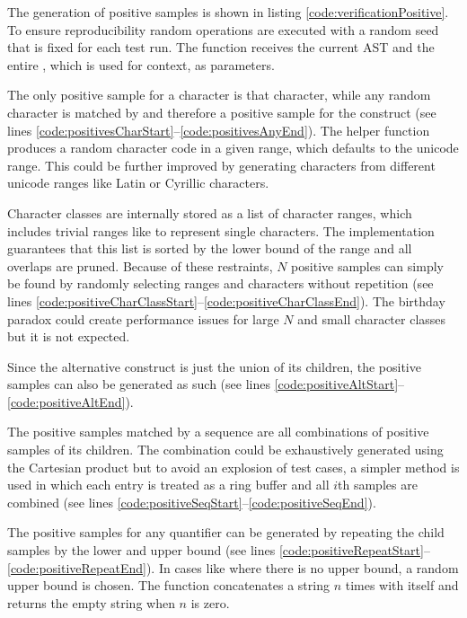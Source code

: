 The generation of positive samples is shown in listing \ref{code:verificationPositive}. To ensure reproducibility random operations are executed with a random seed that is fixed for each test run. The function receives the current AST  and the entire , which is used for context, as parameters.

The only positive sample for a character is that character, while any random character is matched by and therefore a positive sample for the  construct (see lines \ref{code:positivesCharStart}--\ref{code:positivesAnyEnd}). The helper function  produces a random character code in a given range, which defaults to the unicode range. This could be further improved by generating characters from different unicode ranges like Latin or Cyrillic characters.

Character classes are internally stored as a list of character ranges, which includes trivial ranges like \pattern{[a-a]} to represent single characters. The implementation guarantees that this list is sorted by the lower bound of the range and all overlaps are pruned. Because of these restraints, $N$ positive samples can simply be found by randomly selecting ranges and characters without repetition (see lines \ref{code:positiveCharClassStart}--\ref{code:positiveCharClassEnd}). The birthday paradox could create performance issues for large $N$ and small character classes but it is not expected.

Since the alternative construct is just the union of its children, the positive samples can also be generated as such (see lines \ref{code:positiveAltStart}--\ref{code:positiveAltEnd}).

The positive samples matched by a sequence are all combinations of positive samples of its children. The combination could be exhaustively generated using the Cartesian product but to avoid an explosion of test cases, a simpler method is used in which each entry is treated as a ring buffer and all $i$th samples are combined (see lines \ref{code:positiveSeqStart}--\ref{code:positiveSeqEnd}).

The positive samples for any quantifier can be generated by repeating the child samples by the lower and upper bound (see lines \ref{code:positiveRepeatStart}--\ref{code:positiveRepeatEnd}). In cases like  where there is no upper bound, a random upper bound is chosen. The function  concatenates a string $n$ times with itself and returns the empty string when $n$ is zero.

